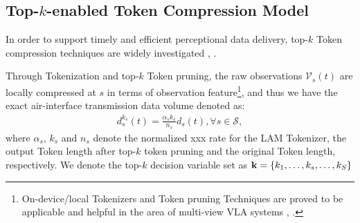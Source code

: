 \documentclass[lettersize,journal]{IEEEtran}
\theoremstyle{custom}
\begin{document}

\subsection{Top-$k$-enabled Token Compression Model}
In order to support timely and efficient perceptional data delivery, top-$k$ Token compression techniques are widely investigated \cite{}, \cite{}. 

Through Tokenization and top-$k$ Token pruning, the raw observations $\mathcal{V}_s(t)$ are locally compressed at $s$ in terms of observation feature\footnote{On-device/local Tokenizers and Token pruning Techniques are proved to be applicable and helpful in the area of multi-view VLA systems \cite{}, \cite{}. }, and thus we have the exact air-interface transmission data volume denoted as: 
\begin{align}
    d_s^{k_s}(t) = \frac{\alpha_s k_s}{n_s} d_s(t), \forall s \in \mathcal{S}, 
\end{align}
where $\alpha_s$, $k_s$ and $n_s$ denote the normalized xxx rate for the LAM Tokenizer, the output Token length after top-$k$ token pruning and the original Token length, respectively. We denote the top-$k$ decision variable set as ${\bf k} = \{k_1, \ldots, k_s, \ldots, k_S\}$
\end{document}
